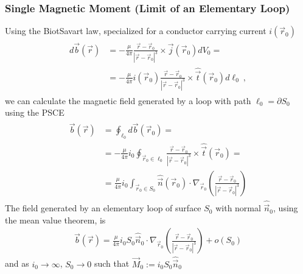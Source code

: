 \documentclass[letterpaper,10pt,english]{jupyterBook}
\begin{document}
\subsubsection{Single Magnetic Moment (Limit of an Elementary Loop)}
\label{\detokenize{ch/principles-matter-magnetization:single-magnetic-moment-limit-of-an-elementary-loop}}
\sphinxAtStartPar
Using the Biot\sphinxhyphen{}Savart law, specialized for a conductor carrying current \(i(\vec{r}_0)\)
\begin{equation*}
\begin{split}\begin{aligned}
  d \vec{b}(\vec{r})
  & = - \frac{\mu}{4 \pi} \frac{\vec{r} - \vec{r}_0}{|\vec{r} - \vec{r}_0|^3} \times \vec{j}(\vec{r}_0) d V_0 = \\
  & = - \frac{\mu}{4 \pi} i(\vec{r}_0) \frac{\vec{r} - \vec{r}_0}{|\vec{r} - \vec{r}_0|^3} \times \hat{\vec{t}}(\vec{r}_0) d \ell_0 \ ,
\end{aligned}\end{split}
\end{equation*}
\sphinxAtStartPar
we can calculate the magnetic field generated by a loop with path \(\ell_0 = \partial S_0\) using the PSCE
\begin{equation*}
\begin{split}\begin{aligned}
  \vec{b}(\vec{r})
  & = \oint_{\ell_0} d \vec{b}(\vec{r}_0) = \\
  & = - \frac{\mu}{4 \pi} i_0 \oint_{\vec{r}_0 \in \ell_0} \frac{\vec{r} - \vec{r}_0}{|\vec{r} - \vec{r}_0|^3} \times \hat{\vec{t}}(\vec{r}_0)  = \\
  & =   \frac{\mu}{4 \pi} i_0 \int_{\vec{r}_0 \in S_0} \hat{\vec{n}}(\vec{r}_0) \cdot \nabla_{\vec{r}_0} \left( \frac{\vec{r} - \vec{r}_0}{|\vec{r} - \vec{r}_0|^3} \right)
\end{aligned}\end{split}
\end{equation*}
\sphinxAtStartPar
The field generated by an elementary loop of surface \(S_0\) with normal \(\hat{\vec{n}}_0\), using the mean value theorem, is
\begin{equation*}
\begin{split}\vec{b}(\vec{r}) = \frac{\mu}{4 \pi} i_0 S_0 \hat{\vec{n}}_0 \cdot \nabla_{\vec{r}_0} \left( \frac{\vec{r} - \vec{r}_0}{|\vec{r} - \vec{r}_0|^3} \right) + o(S_0)\end{split}
\end{equation*}
\sphinxAtStartPar
and as \(i_0 \rightarrow \infty\), \(S_0 \rightarrow 0\) such that \(\vec{M}_0 := i_0 S_0 \hat{\vec{n}}_0\)
\end{document}
